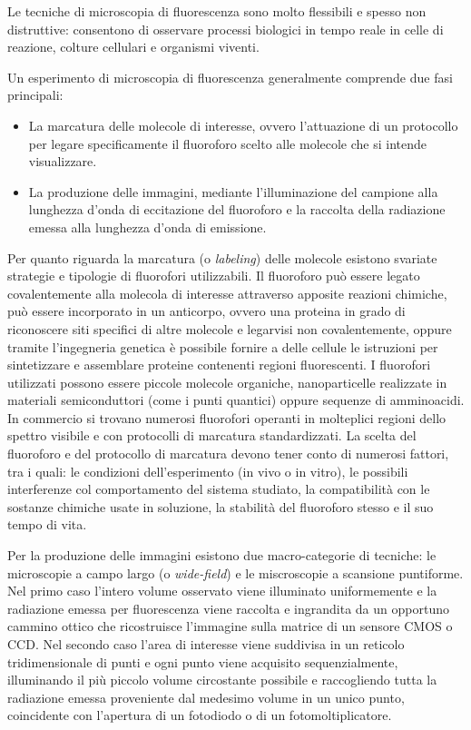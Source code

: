 Le tecniche di microscopia di fluorescenza sono molto flessibili
e spesso non distruttive: consentono di osservare processi biologici
in tempo reale in celle di reazione, colture cellulari e organismi
viventi.

Un esperimento di microscopia di fluorescenza generalmente
comprende due fasi principali:
\begin{itemize}
    \item La marcatura delle molecole di interesse, ovvero
        l'attuazione di un protocollo per legare specificamente il
        fluoroforo scelto alle molecole che si intende visualizzare.
    \item La produzione delle immagini, mediante l'illuminazione del
        campione alla lunghezza d'onda di eccitazione del fluoroforo
        e la raccolta della radiazione emessa alla lunghezza d'onda
        di emissione.
\end{itemize}

Per quanto riguarda la marcatura (o \textit{labeling}) delle
molecole esistono svariate strategie e tipologie di fluorofori
utilizzabili. Il fluoroforo può essere legato covalentemente alla
molecola di interesse attraverso apposite reazioni chimiche,
può essere incorporato in un anticorpo, ovvero una proteina
in grado di riconoscere siti specifici di altre molecole e legarvisi
non covalentemente, oppure tramite l'ingegneria genetica è possibile
fornire a delle cellule le istruzioni per sintetizzare e assemblare
proteine contenenti regioni fluorescenti.
I fluorofori utilizzati possono essere piccole molecole organiche,
nanoparticelle realizzate in materiali semiconduttori (come i punti
quantici) oppure sequenze di amminoacidi.
In commercio si trovano numerosi fluorofori operanti in molteplici
regioni dello spettro visibile e con protocolli di marcatura
standardizzati. La scelta del fluoroforo e del protocollo di marcatura
devono tener conto di numerosi fattori, tra i quali: le condizioni
dell'esperimento (in vivo o in vitro), le possibili interferenze col
comportamento del sistema studiato, la compatibilità con le sostanze
chimiche usate in soluzione, la stabilità del fluoroforo stesso e il 
suo tempo di vita.

Per la produzione delle immagini esistono due macro-categorie di
tecniche: le microscopie a campo largo (o \textit{wide-field}) e
le miscroscopie a scansione puntiforme.
Nel primo caso l'intero volume osservato viene illuminato
uniformemente e la radiazione emessa per fluorescenza viene raccolta
e ingrandita da un opportuno cammino ottico che ricostruisce
l'immagine sulla matrice di un sensore CMOS o CCD.
Nel secondo caso l'area di interesse viene suddivisa in un reticolo
tridimensionale di punti e ogni punto viene acquisito sequenzialmente,
illuminando il più piccolo volume circostante possibile e raccogliendo
tutta la radiazione emessa proveniente dal medesimo volume in un
unico punto, coincidente con l'apertura di un fotodiodo o di un
fotomoltiplicatore.

